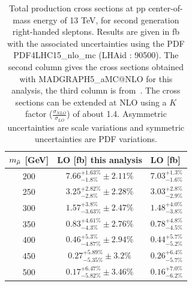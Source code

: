 \documentclass{cernatlasnote}
\begin{document}
\begin{table}
    \centering
    \begin{tabular}{ | c || c | m{6em} |}
        \hline
        \rowcolor{lightgray} 
         $m_{\Tilde{\mu}}$ [GeV]  & LO [fb] this analysis & LO [fb] \cite{Fuks_2014} \\
         \hline
         \hline
         200 & $7.66^{+1.63\%}_{-1.8\%} \pm 2.11\% $  & $7.03^{+1.3\%}_{-1.6\%}$  \\
         \hline
         250  & $3.25^{+2.82\%}_{-2.8\%} \pm 2.28\%$   & $3.03^{+2.8\%}_{-2.9\%}$  \\
         \hline
         300  & $1.57^{+3.8\%}_{-3.63\%} \pm 2.47\%$ & $1.48^{+4.0\%}_{-3.8\%}$  \\
         \hline
         350  & $0.83^{+4.61\%}_{-4.3\%} \pm 2.76\% $  & $0.78^{+4.8\%}_{-4.5\%}$  \\
         \hline
         400   & $0.46^{+5.3\%}_{-4.87\%} \pm 2.94\%$ & $0.44^{+5.7\%}_{-5.2\%}$ \\
         \hline
         450   & $0.27^{+5.89\%}_{-5.35\%} \pm 3.2\%$   & $0.26^{+6.4\%}_{-5.7\%}$  \\
         \hline
         500  & $0.17^{+6.47\%}_{-5.82\%} \pm 3.46\%$   & $0.16^{+7.0\%}_{-6.2\%}$ \\
         \hline
    \end{tabular}
    \caption{Total production cross sections at pp center-of-mass  energy of 13 TeV, for second generation right-handed sleptons. Results are given in fb with the associated uncertainties using the PDF PDF4LHC15\_nlo\_mc (LHAid : 90500). The second column gives the cross sections obtained with MADGRAPH5\_aMC@NLO for this analysis, the third column is from~\cite{Fuks_2014}. The cross sections can be extended at NLO using a $K$ factor ($\frac{\sigma_{NLO}}{\sigma_{LO}}$) of about 1.4. Asymmetric uncertainties are scale variations and symmetric uncertainties are PDF variations.} 
    \label{tab:RIGHTXS}
\end{table}
\end{document}
